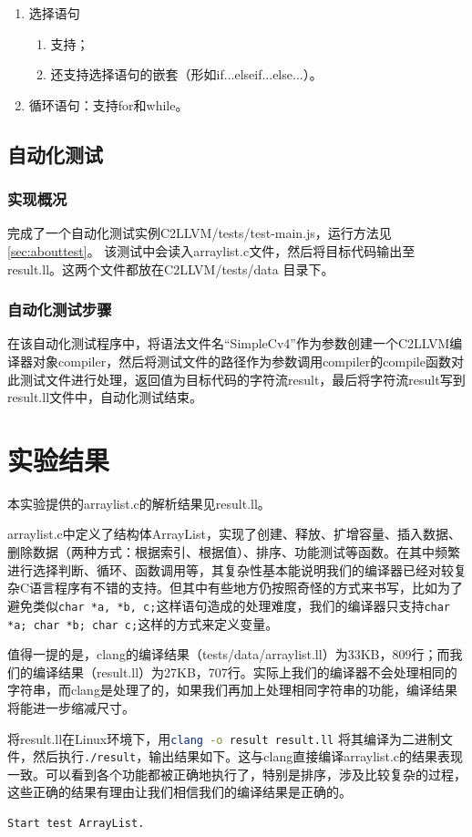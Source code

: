 \documentclass[a4paper]{article}
\begin{document}
\begin{CJK*}{UTF8}{gbsn}
\begin{enumerate}
        \item 选择语句
        \begin{enumerate}
            \item 支持；
            \item 还支持选择语句的嵌套（形如if...else{if...else...}）。
        \end{enumerate}

        \item 循环语句：支持for和while。
    \end{enumerate}

    \subsection{自动化测试}
    \subsubsection{实现概况}
    完成了一个自动化测试实例C2LLVM/tests/test-main.js，运行方法见\ref{sec:abouttest}。 该测试中会读入arraylist.c文件，然后将目标代码输出至result.ll。这两个文件都放在C2LLVM/tests/data 目录下。

    \subsubsection{自动化测试步骤}
    在该自动化测试程序中，将语法文件名“SimpleCv4”作为参数创建一个C2LLVM编译器对象compiler，然后将测试文件的路径作为参数调用compiler的compile函数对此测试文件进行处理，返回值为目标代码的字符流result，最后将字符流result写到result.ll文件中，自动化测试结束。

    \section{实验结果}
    本实验提供的arraylist.c的解析结果见result.ll。
    \par arraylist.c中定义了结构体ArrayList，实现了创建、释放、扩增容量、插入数据、删除数据（两种方式：根据索引、根据值）、排序、功能测试等函数。在其中频繁进行选择判断、循环、函数调用等，其复杂性基本能说明我们的编译器已经对较复杂C语言程序有不错的支持。但其中有些地方仍按照奇怪的方式来书写，比如为了避免类似\lstinline{char *a, *b, c;}这样语句造成的处理难度，我们的编译器只支持\lstinline{char *a; char *b; char c;}这样的方式来定义变量。
    \par 值得一提的是，clang的编译结果（tests/data/arraylist.ll）为33KB，809行；而我们的编译结果（result.ll）为27KB，707行。实际上我们的编译器不会处理相同的字符串，而clang是处理了的，如果我们再加上处理相同字符串的功能，编译结果将能进一步缩减尺寸。
    \par 将result.ll在Linux环境下，用\lstinline[language=sh]{clang -o result result.ll} 将其编译为二进制文件，然后执行\lstinline[language=sh]{./result}，输出结果如下。这与clang直接编译arraylist.c的结果表现一致。可以看到各个功能都被正确地执行了，特别是排序，涉及比较复杂的过程，这些正确的结果有理由让我们相信我们的编译结果是正确的。
    \begin{verbatim}
Start test ArrayList.


\end{verbatim}
\end{CJK*}
\end{document}
